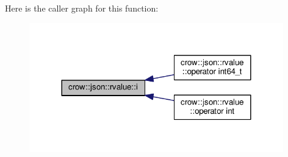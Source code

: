 Here is the caller graph for this function\-:
\nopagebreak
\begin{figure}[H]
\begin{center}
\leavevmode
\includegraphics[width=312pt]{classcrow_1_1json_1_1rvalue_aa1278bfe88422dd8433aa9b463764dfd_icgraph}
\end{center}
\end{figure}


